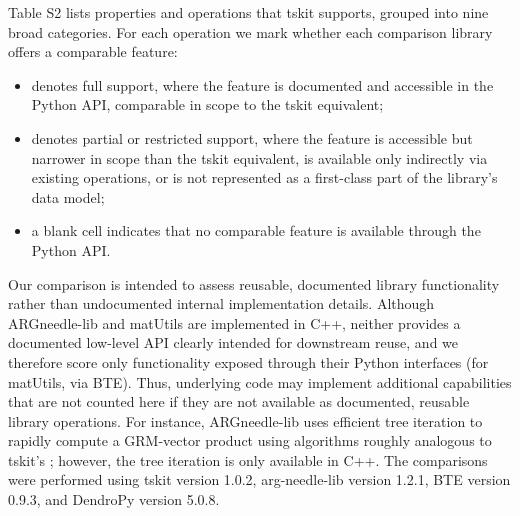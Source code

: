 \documentclass{article}
\begin{document}
Table S2 lists properties and operations that tskit supports, grouped
into nine broad categories.
For each operation we mark whether each comparison library offers a
comparable feature:
\begin{itemize}
\item[\checkmark{}] denotes full support, where the feature is
documented and accessible in the Python API, comparable in scope to
the tskit equivalent;
\item[$\circ$] denotes partial or restricted support, where the
feature is accessible but narrower in scope than the tskit
equivalent, is available only indirectly via existing operations, or
is not represented as a first-class part of the library's data model;
\item[] a blank cell indicates that no comparable feature is
available through the Python API.
\end{itemize}
Our comparison is intended to assess reusable, documented library
functionality rather than undocumented internal implementation
details.
Although ARGneedle-lib and matUtils are implemented in C++, neither
provides a documented low-level API clearly intended for downstream reuse, and
we therefore score only functionality exposed through their Python
interfaces (for matUtils, via BTE).
Thus, underlying code may implement additional capabilities that are
not counted here if they are not available as documented, reusable
library operations.
For instance, ARGneedle-lib uses efficient tree iteration
to rapidly compute a GRM-vector product
using algorithms roughly analogous to tskit's \citep[described in][]{zhu2024fastvariancecomponent};
however, the tree iteration is only available in C++.
The comparisons were performed using tskit version 1.0.2,
arg-needle-lib version 1.2.1, BTE version 0.9.3, and DendroPy version 5.0.8.

\clearpage



\end{document}
